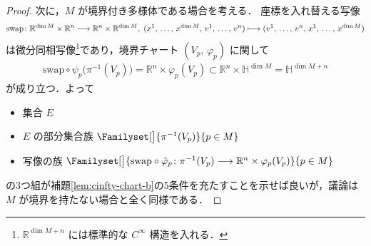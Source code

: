 \documentclass[TQFT_main]{subfiles}
\begin{document}
\begin{proof}
    次に，$M$ が境界付き多様体である場合を考える．
    座標を入れ替える写像
    \begin{align}
        \mathrm{swap} \colon \mathbb{R}^{\dim M} \times \mathbb{R}^n \longrightarrow \mathbb{R}^{n} \times \mathbb{R}^{\dim M},\; (x^1,\, \dots,\, x^{\dim M},\, v^1,\, \dots,\, v^n) \longmapsto (v^1,\, \dots,\, v^n,\, x^1,\, \dots,\, x^{\dim M})
    \end{align}
    は微分同相写像\footnote{$\mathbb{R}^{\dim M + n}$ には標準的な $C^\infty$ 構造を入れる．}であり，境界チャート $(V_p,\, \varphi_p)$ に関して
    \begin{align}
        \mathrm{swap} \circ \psi_p  \bigl( \pi^{-1}(V_p) \bigr) = \mathbb{R}^n \times \varphi_p (V_p) \subset \mathbb{R}^n \times \mathbb{H}^{\dim M} = \mathbb{H}^{\dim M + n}
    \end{align}
    が成り立つ．よって
    \begin{itemize}
        \item 集合 $E$
        \item $E$ の部分集合族 $\Familyset[\big]{\pi^{-1}(V_p)}{p \in M}$
        \item 写像の族 $\Familyset[\big]{\mathrm{swap} \circ \tilde{\varphi}_p \colon \pi^{-1}(V_p) \lto \mathbb{R}^n \times \varphi_p(V_p)}{p \in M}$
    \end{itemize}
    の3つ組が補題\ref{lem:cinfty-chart-b}の5条件を充たすことを示せば良いが，議論は $M$ が境界を持たない場合と全く同様である．
\end{proof}



\end{document}
